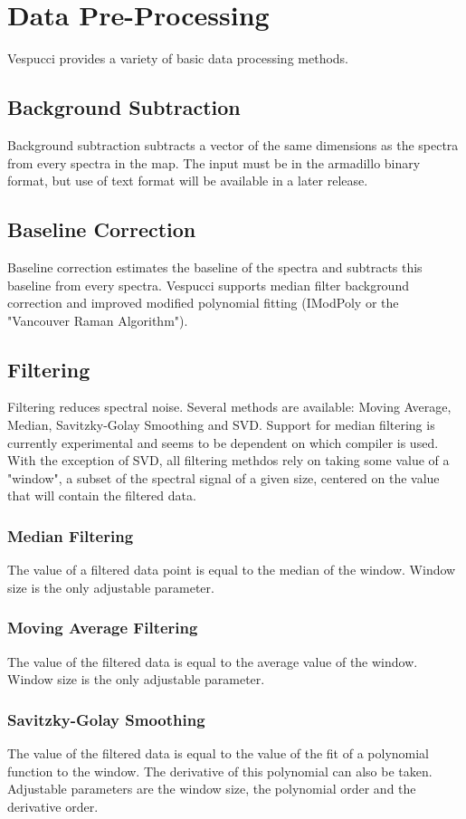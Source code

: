 \documentclass[12pt]{achemso} %
\begin{document}
\section{Data Pre-Processing} 
Vespucci provides a variety of basic data processing methods.

\subsection{Background Subtraction} Background subtraction subtracts a vector of
the same dimensions as the spectra from every spectra in the map. The input must
be in the armadillo binary format, but use of text format will be available in a
later release.

\subsection{Baseline Correction} Baseline correction estimates the baseline of
the spectra and subtracts this baseline from every spectra. Vespucci supports
median filter background correction and improved modified polynomial fitting
(IModPoly or the "Vancouver Raman Algorithm").

\subsection{Filtering} Filtering reduces spectral noise. Several methods are
available: Moving Average, Median, Savitzky-Golay Smoothing and SVD. Support for
median filtering is currently experimental and seems to be dependent on which
compiler is used. With the exception of SVD, all filtering methdos rely on
taking some value of a "window", a subset of the spectral signal of a given
size, centered on the value that will contain the filtered data.

\subsubsection{Median Filtering} The value of a filtered data point is equal to
the median of the window. Window size is the only adjustable parameter.
\subsubsection{Moving Average Filtering} The value of the filtered data is equal
to the average value of the window. Window size is the only adjustable
parameter. 

\subsubsection{Savitzky-Golay Smoothing} The value of the filtered
data is equal to the value of the fit of a polynomial function to the window.
The derivative of this polynomial can also be taken. Adjustable parameters are
the window size, the polynomial order and the derivative order.
\end{document}
